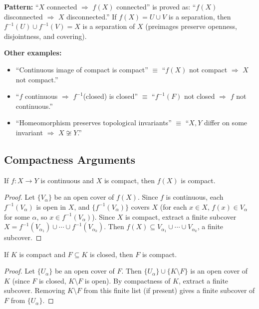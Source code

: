 \documentclass{article}
\begin{document}
\textbf{Pattern:} ``$X$ connected $\Rightarrow$ $f(X)$ connected'' is
proved as: ``$f(X)$ disconnected $\Rightarrow$ $X$ disconnected.'' If
$f(X) = U \cup V$ is a separation, then $f^{-1}(U) \cup f^{-1}(V) = X$
is a separation of $X$ (preimages preserve openness, disjointness, and
covering).

\textbf{Other examples:}
\begin{itemize}
  \item ``Continuous image of compact is compact'' $\equiv$
    ``$f(X)$ not compact $\Rightarrow$ $X$ not compact.''
  \item ``$f$ continuous $\Rightarrow$ $f^{-1}$(closed) is closed''
    $\equiv$ ``$f^{-1}(F)$ not closed $\Rightarrow$ $f$ not continuous.''
  \item ``Homeomorphism preserves topological invariants'' $\equiv$
    ``$X, Y$ differ on some invariant $\Rightarrow$ $X \not\cong Y$.''
\end{itemize}

\subsection{Compactness Arguments}

\begin{theorem}
  If $f : X \to Y$ is continuous and $X$ is compact, then $f(X)$ is compact.
\end{theorem}
\begin{proof}
  Let $\{V_\alpha\}$ be an open cover of $f(X)$. Since $f$ is continuous,
  each $f^{-1}(V_\alpha)$ is open in $X$, and $\{f^{-1}(V_\alpha)\}$ covers $X$
  (for each $x \in X$, $f(x) \in V_\alpha$ for some $\alpha$, so $x
  \in f^{-1}(V_\alpha)$).
  Since $X$ is compact, extract a finite subcover $X =
  f^{-1}(V_{\alpha_1}) \cup \cdots \cup f^{-1}(V_{\alpha_k})$.
  Then $f(X) \subseteq V_{\alpha_1} \cup \cdots \cup V_{\alpha_k}$, a
  finite subcover.
\end{proof}

\begin{theorem}
  If $K$ is compact and $F \subseteq K$ is closed, then $F$ is compact.
\end{theorem}
\begin{proof}
  Let $\{U_\alpha\}$ be an open cover of $F$. Then $\{U_\alpha\} \cup
  \{K \setminus F\}$
  is an open cover of $K$ (since $F$ is closed, $K \setminus F$ is open).
  By compactness of $K$, extract a finite subcover.
  Removing $K \setminus F$ from this finite list (if present) gives a finite
  subcover of $F$ from $\{U_\alpha\}$.
\end{proof}
\end{document}
